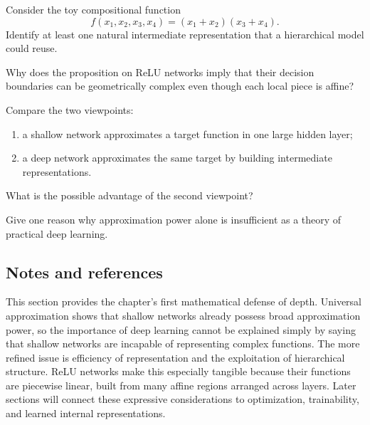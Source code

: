 \begin{exercise}
Consider the toy compositional function
\[
f(x_1,x_2,x_3,x_4)=(x_1+x_2)(x_3+x_4).
\]
Identify at least one natural intermediate representation that a hierarchical model could reuse.
\end{exercise}

\begin{exercise}
Why does the proposition on ReLU networks imply that their decision boundaries can be geometrically complex even though each local piece is affine?
\end{exercise}

\begin{exercise}
Compare the two viewpoints:
\begin{enumerate}
    \item a shallow network approximates a target function in one large hidden layer;
    \item a deep network approximates the same target by building intermediate representations.
\end{enumerate}
What is the possible advantage of the second viewpoint?
\end{exercise}

\begin{exercise}
Give one reason why approximation power alone is insufficient as a theory of practical deep learning.
\end{exercise}

\subsection*{Notes and references}

This section provides the chapter's first mathematical defense of depth. Universal approximation shows that shallow networks already possess broad approximation power, so the importance of deep learning cannot be explained simply by saying that shallow networks are incapable of representing complex functions. The more refined issue is efficiency of representation and the exploitation of hierarchical structure. ReLU networks make this especially tangible because their functions are piecewise linear, built from many affine regions arranged across layers. Later sections will connect these expressive considerations to optimization, trainability, and learned internal representations.